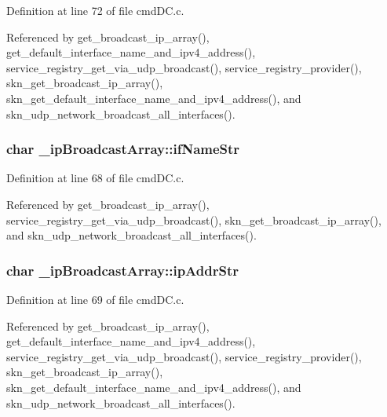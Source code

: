 Definition at line 72 of file cmd\+D\+C.\+c.



Referenced by get\+\_\+broadcast\+\_\+ip\+\_\+array(), get\+\_\+default\+\_\+interface\+\_\+name\+\_\+and\+\_\+ipv4\+\_\+address(), service\+\_\+registry\+\_\+get\+\_\+via\+\_\+udp\+\_\+broadcast(), service\+\_\+registry\+\_\+provider(), skn\+\_\+get\+\_\+broadcast\+\_\+ip\+\_\+array(), skn\+\_\+get\+\_\+default\+\_\+interface\+\_\+name\+\_\+and\+\_\+ipv4\+\_\+address(), and skn\+\_\+udp\+\_\+network\+\_\+broadcast\+\_\+all\+\_\+interfaces().

\subsubsection[{\texorpdfstring{if\+Name\+Str}{ifNameStr}}]{\setlength{\rightskip}{0pt plus 5cm}char \+\_\+ip\+Broadcast\+Array\+::if\+Name\+Str}\hypertarget{struct__ip_broadcast_array_a193b90f271c061e8bf1593bab6a182c9}{}\label{struct__ip_broadcast_array_a193b90f271c061e8bf1593bab6a182c9}


Definition at line 68 of file cmd\+D\+C.\+c.



Referenced by get\+\_\+broadcast\+\_\+ip\+\_\+array(), service\+\_\+registry\+\_\+get\+\_\+via\+\_\+udp\+\_\+broadcast(), skn\+\_\+get\+\_\+broadcast\+\_\+ip\+\_\+array(), and skn\+\_\+udp\+\_\+network\+\_\+broadcast\+\_\+all\+\_\+interfaces().

\subsubsection[{\texorpdfstring{ip\+Addr\+Str}{ipAddrStr}}]{\setlength{\rightskip}{0pt plus 5cm}char \+\_\+ip\+Broadcast\+Array\+::ip\+Addr\+Str}\hypertarget{struct__ip_broadcast_array_a96891ccc707337890b2a166e3ef3a8e1}{}\label{struct__ip_broadcast_array_a96891ccc707337890b2a166e3ef3a8e1}


Definition at line 69 of file cmd\+D\+C.\+c.



Referenced by get\+\_\+broadcast\+\_\+ip\+\_\+array(), get\+\_\+default\+\_\+interface\+\_\+name\+\_\+and\+\_\+ipv4\+\_\+address(), service\+\_\+registry\+\_\+get\+\_\+via\+\_\+udp\+\_\+broadcast(), service\+\_\+registry\+\_\+provider(), skn\+\_\+get\+\_\+broadcast\+\_\+ip\+\_\+array(), skn\+\_\+get\+\_\+default\+\_\+interface\+\_\+name\+\_\+and\+\_\+ipv4\+\_\+address(), and skn\+\_\+udp\+\_\+network\+\_\+broadcast\+\_\+all\+\_\+interfaces().

